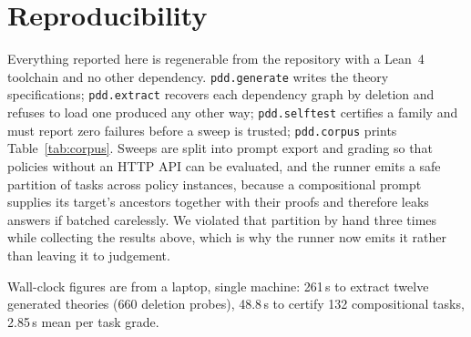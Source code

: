 \documentclass[10pt]{article}
\begin{document}
\section*{Reproducibility}

Everything reported here is regenerable from the repository with a Lean~4
toolchain and no other dependency. \texttt{pdd.generate} writes the theory
specifications; \texttt{pdd.extract} recovers each dependency graph by deletion
and refuses to load one produced any other way; \texttt{pdd.selftest} certifies
a family and must report zero failures before a sweep is trusted;
\texttt{pdd.corpus} prints Table~\ref{tab:corpus}. Sweeps are split into prompt
export and grading so that policies without an HTTP API can be evaluated, and
the runner emits a safe partition of tasks across policy instances, because a
compositional prompt supplies its target's ancestors together with their proofs
and therefore leaks answers if batched carelessly. We violated that partition by
hand three times while collecting the results above, which is why the runner now
emits it rather than leaving it to judgement.

Wall-clock figures are from a laptop, single machine: 261\,s to extract twelve
generated theories (660 deletion probes), 48.8\,s to certify 132 compositional
tasks, 2.85\,s mean per task grade.
\end{document}
